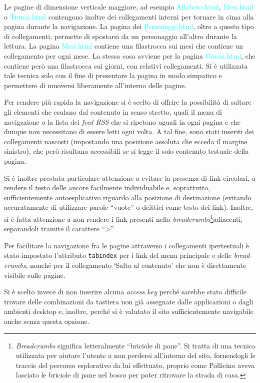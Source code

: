 \documentclass[10pt,a4paper,onecolumn]{article}
\newcommand{\sitepage}[1]{\textcolor{cyan}{\textsf{#1}}}
\newcommand{\inglese}[1]{\foreignlanguage{english}{\itshape{}#1}}
\begin{document}
Le pagine di dimensione verticale maggiore, ad esempio \sitepage{Alfabeto.html}, \sitepage{Mesi.html} o \sitepage{Trama.html} contengono inoltre dei collegamenti interni per tornare in cima alla pagina durante la navigazione. La pagina dei \sitepage{Personaggi.html}, oltre a questo tipo di collegamenti, permette di spostarsi da un personaggio all'altro durante la lettura. La pagina \sitepage{Mesi.html} contiene una filastrocca sui mesi che contiene un collegamento per ogni mese. La stessa cosa avviene per la pagina \sitepage{Giorni.html}, che contiene però una filastrocca sui giorni, con relativi collegamenti. Si è utilizzata tale tecnica solo con il fine di presentare la pagina in modo simpatico e permettere di muoversi liberamente all'interno delle pagine.



Per rendere più rapida la navigazione si è scelto di offrire la possibilità di saltare gli elementi che esulano dal contenuto in senso stretto, quali il menu di navigazione o la lista dei \inglese{feed RSS} che si ripetono uguali in ogni pagina e che dunque non necessitano di essere letti ogni volta. A tal fine, sono stati inseriti dei collegamenti nascosti (impostando una posizione assoluta che ecceda il margine sinistro), che però risultano accessibili se si legge il solo contenuto testuale della pagina.

Si è inoltre prestata particolare attenzione a evitare la presenza di link circolari, a rendere il testo delle ancore facilmente individuabile e, soprattutto, sufficientemente autoesplicativo riguardo alla posizione di destinazione (evitando accuratamente di utilizzare parole ``vuote'' o deittici come testo dei link).
Inoltre, si è fatta attenzione a non rendere i link presenti nella \inglese{breadcrumbs}\footnote{%
   \inglese{Breadcrumbs} significa letteralmente ``briciole di pane''. Si tratta di una tecnica utilizzata per aiutare l'utente a non perdersi all'interno del sito, fornendogli le traccie del percorso esplorativo da lui effettuato, proprio come Pollicino aveva lasciato le briciole di pane nel bosco per poter ritrovare la strada di casa.}adiacenti, separandoli tramite il carattere ``>''

Per facilitare la navigazione fra le pagine attraverso i collegamenti ipertestuali è stato impostato l'attributo \texttt{tabindex} per i link del menu principale e delle \inglese{breadcrumbs}, nonché per il collegamento `Salta al contenuto' che non è direttamente visibile sulle pagine.

Si è scelto invece di non inserire alcuna \inglese{access key} perché sarebbe stato difficile trovare delle combinazioni da tastiera non già assegnate dalle applicazioni o dagli ambienti desktop e, inoltre, perché si è valutato il sito sufficientemente navigabile anche senza questa opzione.
\end{document}
